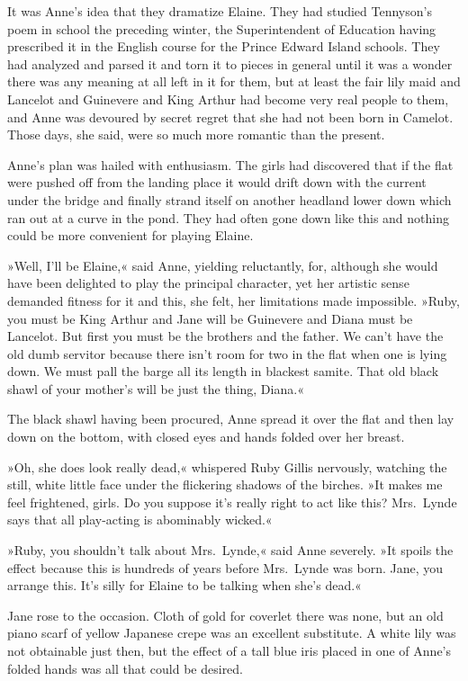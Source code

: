 It was Anne's idea that they dramatize Elaine. They had studied Tennyson's poem in school the preceding winter, the Superintendent of Education having prescribed it in the English course for the Prince Edward Island schools. They had analyzed and parsed it and torn it to pieces in general until it was a wonder there was any meaning at all left in it for them, but at least the fair lily maid and Lancelot and Guinevere and King Arthur had become very real people to them, and Anne was devoured by secret regret that she had not been born in Camelot. Those days, she said, were so much more romantic than the present.

Anne's plan was hailed with enthusiasm. The girls had discovered that if the flat were pushed off from the landing place it would drift down with the current under the bridge and finally strand itself on another headland lower down which ran out at a curve in the pond. They had often gone down like this and nothing could be more convenient for playing Elaine.

»Well, I'll be Elaine,« said Anne, yielding reluctantly, for, although she would have been delighted to play the principal character, yet her artistic sense demanded fitness for it and this, she felt, her limitations made impossible. »Ruby, you must be King Arthur and Jane will be Guinevere and Diana must be Lancelot. But first you must be the brothers and the father. We can't have the old dumb servitor because there isn't room for two in the flat when one is lying down. We must pall the barge all its length in blackest samite. That old black shawl of your mother's will be just the thing, Diana.«

The black shawl having been procured, Anne spread it over the flat and then lay down on the bottom, with closed eyes and hands folded over her breast.

»Oh, she does look really dead,« whispered Ruby Gillis nervously, watching the still, white little face under the flickering shadows of the birches. »It makes me feel frightened, girls. Do you suppose it's really right to act like this? Mrs.~Lynde says that all play-acting is abominably wicked.«

»Ruby, you shouldn't talk about Mrs.~Lynde,« said Anne severely. »It spoils the effect because this is hundreds of years before Mrs.~Lynde was born. Jane, you arrange this. It's silly for Elaine to be talking when she's dead.«

Jane rose to the occasion. Cloth of gold for coverlet there was none, but an old piano scarf of yellow Japanese crepe was an excellent substitute. A white lily was not obtainable just then, but the effect of a tall blue iris placed in one of Anne's folded hands was all that could be desired.

